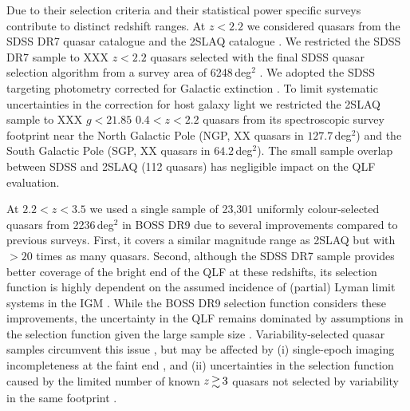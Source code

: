 \documentclass[fleqn,usenatbib]{mnras}
\begin{document}
Due to their selection criteria and their statistical power specific
surveys contribute to distinct redshift ranges. At $z<2.2$ we
considered quasars from the SDSS DR7 quasar catalogue
\citep{2010AJ....139.2360S} and the 2SLAQ catalogue
\citep{2009MNRAS.392...19C}. We restricted the SDSS DR7 sample to XXX
$z<2.2$ quasars selected with the final SDSS quasar selection
algorithm \citep{2002AJ....123.2945R, 2006AJ....131.2766R} from a
survey area of 6248\,deg$^2$ \citep{2012ApJ...746..169S}. We adopted
the SDSS targeting photometry corrected for Galactic extinction
\citep{2010AJ....139.2360S}. To limit systematic uncertainties in the
correction for host galaxy light \citep{2009MNRAS.392...19C} we
restricted the 2SLAQ sample to XXX $g<21.85$ $0.4<z<2.2$ quasars from
its spectroscopic survey footprint near the North Galactic Pole (NGP,
XX quasars in $127.7$\,deg$^2$) and the South Galactic Pole (SGP, XX
quasars in $64.2$\,deg$^2$). The small sample overlap between SDSS and
2SLAQ (112 quasars) has negligible impact on the QLF evaluation.

At $2.2<z<3.5$ we used a single sample of 23,301 uniformly
colour-selected quasars from 2236\,deg$^2$ in BOSS DR9
\citep{2013ApJ...773...14R} due to several improvements compared to
previous surveys. First, it covers a similar magnitude range as 2SLAQ
but with $>20$ times as many quasars. Second, although the SDSS DR7
sample provides better coverage of the bright end of the QLF at these
redshifts, its selection function is highly dependent on the assumed
incidence of (partial) Lyman limit systems in the IGM
\citep{2009ApJ...705L.113P, 2011ApJ...728...23W}. While the BOSS DR9
selection function considers these improvements, the uncertainty in
the QLF remains dominated by assumptions in the selection function
given the large sample size
\citep{2013ApJ...773...14R}. Variability-selected quasar samples
circumvent this issue \citep{2013ApJ...773...14R, 2013A&A...551A..29P,
  2016A&A...587A..41P}, but may be affected by (i) single-epoch
imaging incompleteness at the faint end \citep{2013ApJ...773...14R},
and (ii) uncertainties in the selection function caused by the limited
number of known $z\ga 3$ quasars not selected by variability in the
same footprint \citep{2013A&A...551A..29P, 2016A&A...587A..41P}.
\end{document}
